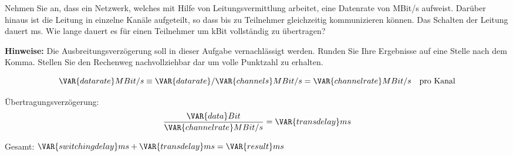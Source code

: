\question[5]

Nehmen Sie an, dass ein Netzwerk, welches mit Hilfe von Leitungsvermittlung
arbeitet, eine Datenrate von  MBit/s aufweist. Darüber hinaus ist die
Leitung in  einzelne Kanäle aufgeteilt, so dass bis zu 
Teilnehmer gleichzeitig kommunizieren können.  Das Schalten der Leitung dauert
 ms. Wie lange dauert es für einen Teilnehmer um  kBit
vollständig zu übertragen?

\textbf{Hinweise:} Die Ausbreitungsverzögerung soll in dieser Aufgabe vernachlässigt werden. Runden Sie Ihre Ergebnisse auf eine Stelle nach dem Komma. Stellen Sie den
Rechenweg nachvollziehbar dar um volle Punktzahl zu erhalten.

\begin{solutionbox}{5cm}
	\[
		\VAR{datarate} MBit/s \equiv \VAR{datarate}/\VAR{channels} MBit/s = \VAR{channelrate} MBit/s \quad\textrm{pro Kanal}
	\]

	Übertragungsverzögerung:
	\[ \frac{\VAR{data} Bit}{\VAR{channelrate} MBit/s} = \VAR{transdelay} ms\]

	Gesamt: $\VAR{switchingdelay} ms + \VAR{transdelay} ms = \VAR{result} ms$
\end{solutionbox}
